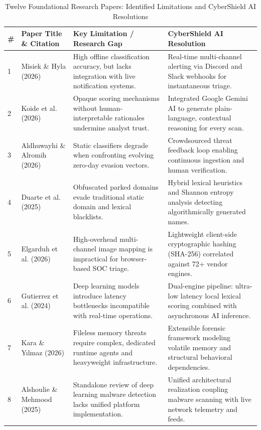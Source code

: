 \documentclass[conference]{IEEEtran}
\begin{document}
\begin{table}[t]
\caption{Twelve Foundational Research Papers: Identified Limitations and CyberShield AI Resolutions}
\label{tab:gap_analysis}
\centering
\small
\begin{tabularx}{\textwidth}{p{0.5cm}p{5.2cm}p{5.5cm}X}
\toprule
\textbf{\#} & \textbf{Paper Title \& Citation} & \textbf{Key Limitation / Research Gap} & \textbf{CyberShield AI Resolution} \\
\midrule
1 & Misiek \& Hyla (2026) \cite{misiek2026xgboost} & High offline classification accuracy, but lacks integration with live notification systems. & Real-time multi-channel alerting via Discord and Slack webhooks for instantaneous triage. \\
2 & Koide et al. (2026) \cite{koide2026chatspamdetector} & Opaque scoring mechanisms without human-interpretable rationales undermine analyst trust. & Integrated Google Gemini AI to generate plain-language, contextual reasoning for every scan. \\
3 & Aldhuwayhi \& Alromih (2026) \cite{aldhuwayhi2026dynamic} & Static classifiers degrade when confronting evolving zero-day evasion vectors. & Crowdsourced threat feedback loop enabling continuous ingestion and human verification. \\
4 & Duarte et al. (2025) \cite{duarte2025machine} & Obfuscated parked domains evade traditional static domain and lexical blacklists. & Hybrid lexical heuristics and Shannon entropy analysis detecting algorithmically generated names. \\
5 & Elgarduh et al. (2026) \cite{elgarduh2026hybrid} & High-overhead multi-channel image mapping is impractical for browser-based SOC triage. & Lightweight client-side cryptographic hashing (SHA-256) correlated against 72+ vendor engines. \\
6 & Gutierrez et al. (2024) \cite{gutierrez2024application} & Deep learning models introduce latency bottlenecks incompatible with real-time operations. & Dual-engine pipeline: ultra-low latency local lexical scoring combined with asynchronous AI inference. \\
7 & Kara \& Y\i lmaz (2026) \cite{kara2026hap} & Fileless memory threats require complex, dedicated runtime agents and heavyweight infrastructure. & Extensible forensic framework modeling volatile memory and structural behavioral dependencies. \\
8 & Alshoulie \& Mehmood (2025) \cite{alshoulie2025deep} & Standalone review of deep learning malware detection lacks unified platform implementation. & Unified architectural realization coupling malware scanning with live network telemetry and feeds. \\

\end{tabularx}
\end{table}
\end{document}
